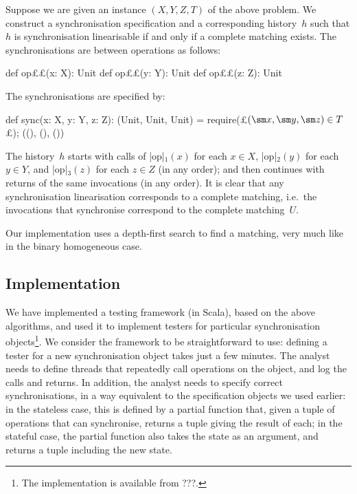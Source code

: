 Suppose we are given an instance $(X, Y, Z, T)$ of the above problem.  We
construct a synchronisation specification and a corresponding history~$h$ such
that $h$ is synchronisation linearisable if and only if a complete matching
exists.  The synchronisations are between operations as follows:
\begin{scala}
  def op££(x: X): Unit
  def op££(y: Y): Unit
  def op££(z: Z): Unit
\end{scala}
%
The synchronisations are specified by:
%
\begin{scala}
  def sync(x: X, y: Y, z: Z): (Unit, Unit, Unit) = {
    require(£$(\sm x, \sm y, \sm z) \in T$£); ((), (), ())
  }
\end{scala}
%
The history~$h$ starts with calls of |op|$_1(x)$ for each $x \in X$,
|op|$_2(y)$ for each $y \in Y$, and |op|$_3(z)$ for each $z \in Z$ (in any
order); and then continues with returns of the same invocations (in any
order).  It is clear that any synchronisation linearisation corresponds to a
complete matching, i.e.~the invocations that synchronise correspond to the
complete matching~$U$.

Our implementation uses a depth-first search to find a matching, very much
like in the binary homogeneous case. 


\subsection{Implementation}

We have implemented a testing framework (in Scala), based on the above
algorithms, and used it to implement testers for particular synchronisation
objects\footnote{The implementation is available from ???.}.  We consider the
framework to be straightforward to use: defining a tester for a new
synchronisation object takes just a few minutes.  The analyst needs to define
threads that repeatedly call operations on the object, and log the calls and
returns.  In addition, the analyst needs to specify correct synchronisations,
in a way equivalent to the specification objects we used earlier: in the
stateless case, this is defined by a partial function that, given a tuple of
operations that can synchronise, returns a tuple giving the result of each; in
the stateful case, the partial function also takes the state as an argument,
and returns a tuple including the new state.
